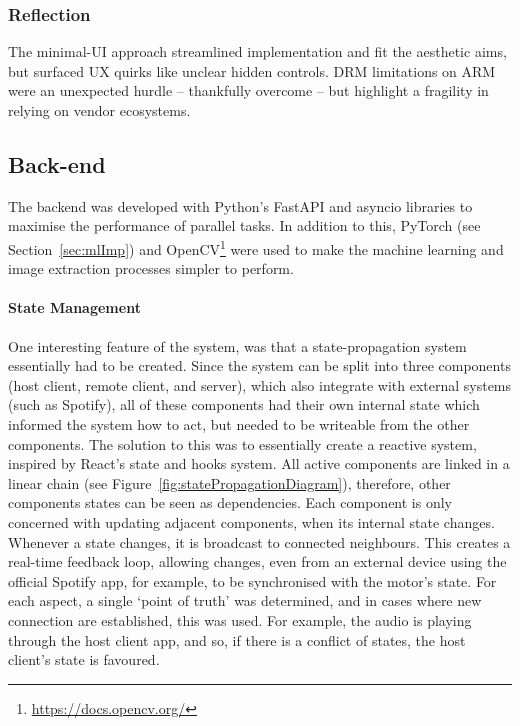             \subsubsection*{Reflection}
                The minimal-UI approach streamlined implementation and fit the aesthetic aims, but surfaced UX quirks like unclear hidden controls. DRM limitations on ARM were an unexpected hurdle -- thankfully overcome -- but highlight a fragility in relying on vendor ecosystems.
    
        \subsection{Back-end} %
    
            The backend was developed with Python's FastAPI and asyncio libraries to maximise the performance of parallel tasks. In addition to this, PyTorch (see Section~\ref{sec:mlImp}) and OpenCV\footnote{\url{https://docs.opencv.org/}} were used to make the machine learning and image extraction processes simpler to perform.
    
            \paragraph{State Management}
            One interesting feature of the system, was that a state-propagation system essentially had to be created. Since the system can be split into three components (host client, remote client, and server), which also integrate with external systems (such as Spotify), all of these components had their own internal state which informed the system how to act, but needed to be writeable from the other components. The solution to this was to essentially create a reactive system, inspired by React's state and hooks system. All active components are linked in a linear chain (see Figure~\ref{fig:statePropagationDiagram}), therefore, other components states can be seen as dependencies. Each component is only concerned with updating adjacent components, when its internal state changes. Whenever a state changes, it is broadcast to connected neighbours. This creates a real-time feedback loop, allowing changes, even from an external device using the official Spotify app, for example, to be synchronised with the motor's state. For each aspect, a single `point of truth' was determined, and in cases where new connection are established, this was used. For example, the audio is playing through the host client app, and so, if there is a conflict of states, the host client's state is favoured.
            
